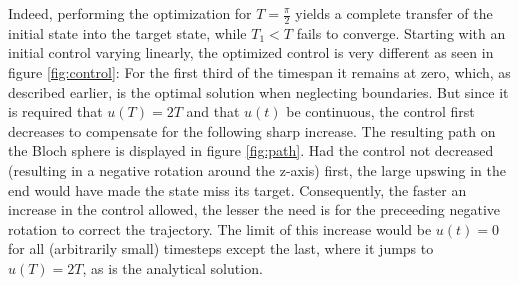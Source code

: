 Indeed, performing the optimization for $T = \frac{\pi}{2}$ yields a complete transfer of the initial state into the target state, while $T_1 < T$ fails to converge. Starting with an initial control varying linearly, the optimized control is very different as seen in figure \ref{fig:control}: For the first third of the timespan it remains at zero, which, as described earlier, is the optimal solution when neglecting boundaries. But since it is required that $u(T) = 2 T$ and that $u(t)$ be continuous, the control first decreases to compensate for the following sharp increase. The resulting path on the Bloch sphere is displayed in figure \ref{fig:path}. Had the control not decreased (resulting in a negative rotation around the z-axis) first, the large upswing in the end would have made the state miss its target. Consequently, the faster an increase in the control allowed, the lesser the need is for the preceeding negative rotation to correct the trajectory. The limit of this increase would be $u(t)=0$ for all (arbitrarily small) timesteps except the last, where it jumps to $u(T)=2T$, as is the analytical solution.
